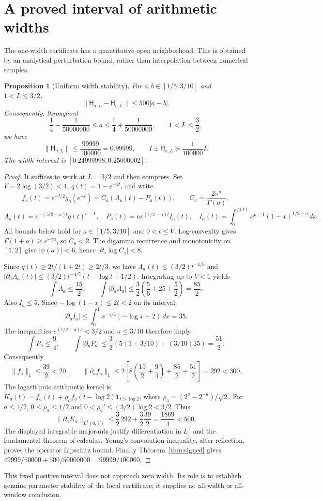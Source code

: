 \documentclass[11pt,letterpaper]{article}
\newtheorem{proposition}[theorem]{Proposition}
\begin{document}
\section{A proved interval of arithmetic widths}
The one-width certificate has a quantitative open neighborhood. This is obtained by an analytical perturbation bound, rather than interpolation between numerical samples.

\begin{proposition}[Uniform width stability]\label{prop:widthlipschitz}
For $a,b\in[1/5,3/10]$ and $1<L\leq3/2$,
\[
 \|\mathsf H_{a,L}-\mathsf H_{b,L}\|\leq500|a-b|.
\]
Consequently, throughout
\[
 \frac14-\frac1{50000000}\leq a\leq\frac14+\frac1{50000000},
 \qquad 1<L\leq\frac32,
\]
we have
\[
 \|\mathsf H_{a,L}\|\leq\frac{99999}{100000}=0.99999,
 \qquad I\pm\mathsf H_{a,L}\succeq\frac1{100000}I.
\]
The width interval is $[0.24999998,0.25000002]$.
\end{proposition}
\begin{proof}
It suffices to work at $L=3/2$ and then compress. Set $V=2\log(3/2)<1$, $q(t)=1-e^{-2t}$, and write
\[
 f_a(t)=e^{-t/2}g_a(e^{-t})=C_a(A_a(t)-P_a(t)),\qquad
 C_a=\frac{2\pi^a}{\Gamma(a)},
\]
\[
 A_a(t)=e^{-(5/2-a)t}q(t)^{a-1},\quad
 P_a(t)=ae^{(1/2-a)t}I_a(t),\quad
 I_a(t)=\int_0^{q(t)}x^{a-1}(1-x)^{1/2-a}\,dx.
\]
All bounds below hold for $a\in[1/5,3/10]$ and $0<t\leq V$. Log-convexity gives $\Gamma(1+a)\geq e^{-\gamma a}$, so $C_a<2$. The digamma recurrence and monotonicity on $[1,2]$ give $|\psi(a)|<6$, hence $|\partial_a\log C_a|<8$.

Since $q(t)\geq2t/(1+2t)\geq2t/3$, we have $A_a(t)\leq(3/2)t^{-4/5}$ and
$|\partial_a A_a(t)|\leq(3/2)t^{-4/5}(t-\log t+1/2)$. Integrating up to $V<1$ yields
\[
 \int A_a\leq\frac{15}{2},\qquad
 \int|\partial_a A_a|\leq\frac32\left(\frac56+25+\frac52\right)=\frac{85}{2}.
\]
Also $I_a\leq5$. Since $-\log(1-x)\leq2t<2$ on its interval,
\[
 |\partial_a I_a|\leq\int_0^1x^{-4/5}(-\log x+2)\,dx=35.
\]
The inequalities $e^{(1/2-a)t}<3/2$ and $a\leq3/10$ therefore imply
\[
 \int P_a\leq\frac94,\qquad
 \int|\partial_aP_a|\leq\frac32\left(5(1+3/10)+(3/10)35\right)=\frac{51}{2}.
\]
Consequently
\[
 \|f_a\|_1\leq\frac{39}{2}<20,\qquad
 \|\partial_af_a\|_1\leq2\left[8\left(\frac{15}{2}+\frac94\right)+\frac{85}{2}+\frac{51}{2}\right]=292<300.
\]
The logarithmic arithmetic kernel is
$K_a(t)=f_a(t)+\rho_a f_a(t-\log2)\mathbf1_{t>\log2}$,
where $\rho_a=(2^a-2^{-a})/\sqrt2$. For $a\leq1/2$,
$0\leq\rho_a\leq1/2$ and $0<\rho_a'\leq(3/2)\log2<3/2$.
Thus
\[
 \|\partial_aK_a\|_{L^1(0,V)}
 \leq\frac32\,292+\frac32\frac{39}{2}
 =\frac{1869}{4}<500.
\]
The displayed integrable majorants justify differentiation in $L^1$ and the fundamental theorem of calculus. Young's convolution inequality, after reflection, proves the operator Lipschitz bound. Finally Theorem~\ref{thm:signed} gives
$49999/50000+500/50000000=99999/100000$.
\end{proof}
This fixed positive interval does not approach zero width. Its role is to establish genuine parameter stability of the local certificate; it supplies no all-width or all-window conclusion.
\end{document}
